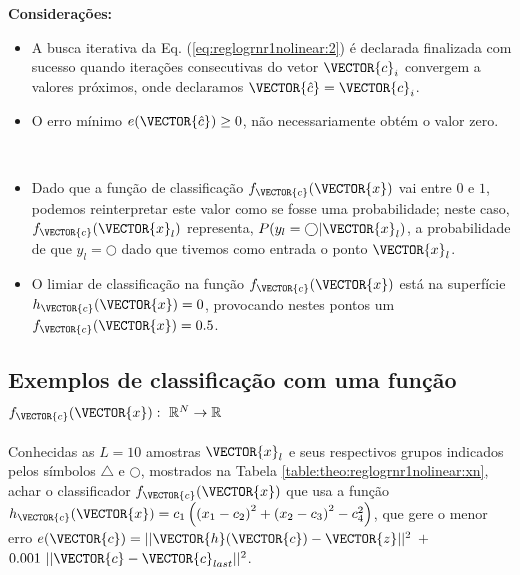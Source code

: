 \begin{theorem}
\textbf{Considerações:}
\begin{itemize}
\item A busca iterativa da Eq. (\ref{eq:reglogrnr1nolinear:2}) 
é declarada finalizada com sucesso 
quando iterações consecutivas do vetor $\VECTOR{c}_i$ convergem a valores próximos, onde declaramos $\VECTOR{\hat{c}}=\VECTOR{c}_i$.
\item O erro mínimo $e(\VECTOR{\hat{c}}) \geq 0$, não necessariamente obtém o valor zero. 
\end{itemize}
\end{theorem}
~

\begin{tcbattention}
\begin{itemize}
\item Dado que a função de classificação $f_{\VECTOR{c}}(\VECTOR{x})$ vai entre $0$ e $1$,
podemos reinterpretar este valor como se fosse uma probabilidade;
neste caso, $f_{\VECTOR{c}}(\VECTOR{x}_l)$ representa, $P(y_l=\bigcirc|\VECTOR{x}_l)$, 
a probabilidade de que $y_l=\bigcirc$ dado que tivemos como entrada o ponto $\VECTOR{x}_l$.
\item O limiar de classificação na função $f_{\VECTOR{c}}(\VECTOR{x})$ está na superfície $h_{\VECTOR{c}}(\VECTOR{x})=0$,
provocando nestes pontos um $f_{\VECTOR{c}}(\VECTOR{x})=0.5$.
\end{itemize}
\end{tcbattention}

\subsection{Exemplos de classificação com uma função
$f_{\VECTOR{c}}(\VECTOR{x}):~\mathbb{R}^N \rightarrow \mathbb{R}$ }

\begin{example}\label{ex:theo:reglogrnr1nolinear}
Conhecidas as $L=10$ amostras $\VECTOR{x}_l$ e seus respectivos 
grupos indicados pelos símbolos $\bigtriangleup$ e $\bigcirc$, 
mostrados na Tabela \ref{table:theo:reglogrnr1nolinear:xn},
achar o classificador $f_{\VECTOR{c}}(\VECTOR{x})$ que usa a função 
$h_{\VECTOR{c}}(\VECTOR{x})=c_1\left( \left(x_1-c_2\right)^2 + \left(x_2-c_3\right)^2 -c_4^2\right)$, 
que gere o menor erro $e(\VECTOR{c}) =  ||\VECTOR{h}(\VECTOR{c})-\VECTOR{z}||^2$ $+$ $0.001~||\VECTOR{c}-\VECTOR{c}_{last}||^2$.
\end{example}


